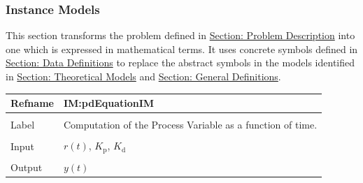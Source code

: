 \documentclass[12pt]{article}
\begin{document}
\subsubsection{Instance Models}
\label{Sec:IMs}
This section transforms the problem defined in \hyperref[Sec:ProbDesc]{Section: Problem Description} into one which is expressed in mathematical terms. It uses concrete symbols defined in \hyperref[Sec:DDs]{Section: Data Definitions} to replace the abstract symbols in the models identified in \hyperref[Sec:TMs]{Section: Theoretical Models} and \hyperref[Sec:GDs]{Section: General Definitions}.

\vspace{\baselineskip}
\noindent
\begin{minipage}{\textwidth}
\begin{tabular}{>{\raggedright}p{}>{\raggedright\arraybackslash}p{}}
\toprule \textbf{Refname} & \textbf{IM:pdEquationIM}
\label{IM:pdEquationIM}
\\ \midrule \\
Label & Computation of the Process Variable as a function of time.
        
\\ \midrule \\
Input & $r(t)$, ${K_{\text{p}}}$, ${K_{\text{d}}}$
        
\\ \midrule \\
Output & $y(t)$
         

\end{tabular}
\end{minipage}
\end{document}
